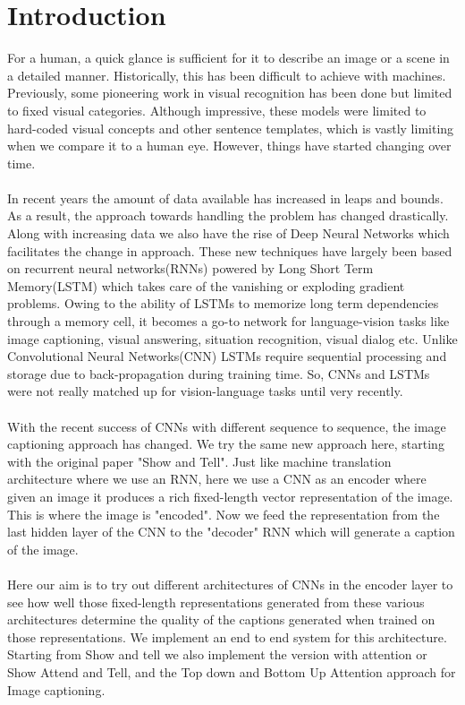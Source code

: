 \documentclass[a4paper]{article}
\begin{document}
\section{Introduction}
For a human, a quick glance is sufficient for it to describe an image or a scene in a detailed manner. Historically, this has been difficult to achieve with machines. Previously, some pioneering work in visual recognition has been done but limited to fixed visual categories. Although impressive, these models were limited to hard-coded visual concepts and other sentence templates, which is vastly limiting when we compare it to a human eye. However, things have started changing over time.
\\
\\
\noindent In  recent years the amount of data available has increased in leaps and bounds. As a result, the approach towards handling the problem has changed drastically. Along with increasing data we also have the rise of Deep Neural Networks which facilitates the change in approach. These new techniques have largely been based on recurrent neural networks(RNNs) powered by Long Short Term Memory(LSTM) which takes care of the vanishing or exploding gradient problems. Owing to the ability of LSTMs to memorize long term dependencies through a memory cell, it becomes a go-to network for language-vision tasks like image captioning, visual answering, situation recognition, visual dialog etc\cite{DBLP:journals/corr/abs-1711-09151}. Unlike Convolutional Neural Networks(CNN) LSTMs require sequential processing and storage due to back-propagation during training time. So, CNNs and LSTMs were not really matched up for vision-language tasks until very recently.
\\
\\
\noindent With the recent success of CNNs with different sequence to sequence, the image captioning approach has changed. We try the same new approach here, starting with the original paper "Show and Tell". Just like machine translation architecture where we use an RNN, here we use a CNN as an encoder where given an image it produces a rich fixed-length vector representation of the image. This is where the image is "encoded". Now we feed the representation from the last hidden layer of the CNN to the "decoder" RNN which will generate a caption of the image.
\\
\\
\noindent Here our aim is to try out different architectures of CNNs in the encoder layer to see how well those fixed-length representations generated from these various architectures determine the quality of the captions generated when trained on those representations. We implement an end to end system for this architecture. Starting from Show and tell we also implement the version with attention or Show Attend and Tell, and the Top down and Bottom Up Attention approach for Image captioning.  
\end{document}
